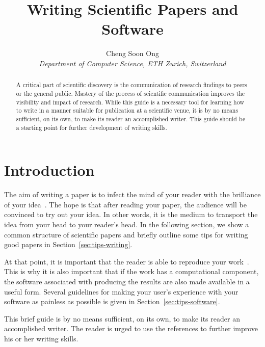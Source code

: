 \documentclass[10pt,conference,compsocconf]{IEEEtran}
\begin{document}
	\title{Writing Scientific Papers and Software}
	
	\author{
		Cheng Soon Ong\\
		\textit{Department of Computer Science, ETH Zurich, Switzerland}
	}
	
	\maketitle
	
	\begin{abstract}
		A critical part of scientific discovery is the
		communication of research findings to peers or the general public.
		Mastery of the process of scientific communication improves the
		visibility and impact of research. While this guide is a necessary
		tool for learning how to write in a manner suitable for publication
		at a scientific venue, it is by no means sufficient, on its own, to
		make its reader an accomplished writer. 
		This guide should be a starting point for further development of 
		writing skills.
	\end{abstract}
	
	\section{Introduction}
	
	The aim of writing a paper is to infect the mind of your reader with
	the brilliance of your idea~\cite{jones08}. 
	The hope is that after reading your
	paper, the audience will be convinced to try out your idea. In other
	words, it is the medium to transport the idea from your head to your
	reader's head. 
	In the following
	section, we show a common structure of scientific papers and briefly
	outline some tips for writing good papers in
	Section~\ref{sec:tips-writing}.
	
	At that
	point, it is important that the reader is able to reproduce your
	work~\cite{schwab00,wavelab,gentleman05}. This is why it is also
	important that if the work has a computational component, the software
	associated with producing the results are also made available in a
	useful form. Several guidelines for making your user's experience with
	your software as painless as possible is given in
	Section~\ref{sec:tips-software}.
	
	This brief guide is by no means sufficient, on its own, to
	make its reader an accomplished writer. The reader is urged to use the
	references to further improve his or her writing skills.
	
\end{document}
